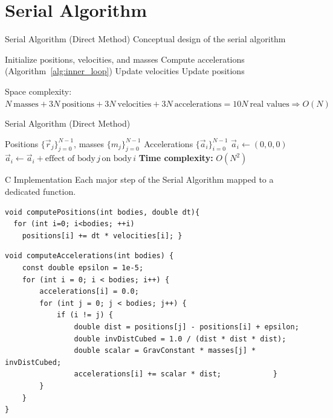 \documentclass{beamer}
\begin{document}
\section{Serial Algorithm}
\begin{frame}{Serial Algorithm (Direct Method)}
Conceptual design of the serial algorithm
\begin{algorithm}[H]
\caption{Serial N-body algorithm (direct method)}
\label{alg:serial}
\begin{algorithmic}[1]
\State Initialize positions, velocities, and masses
    \State Compute accelerations (Algorithm~\ref{alg:inner_loop})
    \State Update velocities
    \State Update positions
\EndFor
\end{algorithmic}
\end{algorithm}
Space complexity:
$N \ \text{masses} + 3N \ \text{positions} + 3N \ \text{velocities} + 3N \ \text{accelerations} = 10N \ \text{real values} \Rightarrow O(N)$ 
\end{frame}

\begin{frame}{Serial Algorithm (Direct Method)}
\begin{algorithm}[H]
\caption{Inner loop: compute accelerations (direct method)}
\label{alg:inner_loop}
\begin{algorithmic}[1]
\Require Positions $\{\vec r_j\}_{j=0}^{N-1}$, masses $\{m_j\}_{j=0}^{N-1}$
\Ensure Accelerations $\{\vec a_i\}_{i=0}^{N-1}$
  \State $\vec a_i \gets (0,0,0)$
      \State $\vec a_i \gets \vec a_i + \text{effect of body}\, j \, \text{on body}\, i$
    \EndIf
  \EndFor
\EndFor
\Statex \textbf{Time complexity:} $O(N^2)$
\end{algorithmic}
\end{algorithm}
\end{frame}




\begin{frame}[fragile]{C Implementation}{}
Each major step of the Serial Algorithm mapped to a dedicated function.

\begin{lstlisting}[style=nbody]
void computePositions(int bodies, double dt){
  for (int i=0; i<bodies; ++i)
    positions[i] += dt * velocities[i]; }
\end{lstlisting}

\vspace{2mm}

\begin{lstlisting}[style=nbody]
void computeAccelerations(int bodies) {
    const double epsilon = 1e-5;
    for (int i = 0; i < bodies; i++) {
        accelerations[i] = 0.0;
        for (int j = 0; j < bodies; j++) {
            if (i != j) {
                double dist = positions[j] - positions[i] + epsilon;
                double invDistCubed = 1.0 / (dist * dist * dist);
                double scalar = GravConstant * masses[j] * invDistCubed;
                accelerations[i] += scalar * dist;            }
        }
    }
}
\end{lstlisting}

\end{frame}
\end{document}
